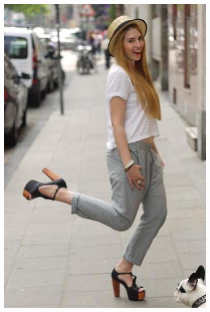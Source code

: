 \documentclass[12pt]{report}
\begin{document}
\begin{figure}
\begin{minipage}[b]{0.3\textwidth}
    \includegraphics[width=\textwidth]{images/resultados/349322original.jpg}

\end{minipage}
\end{figure}
\end{document}
